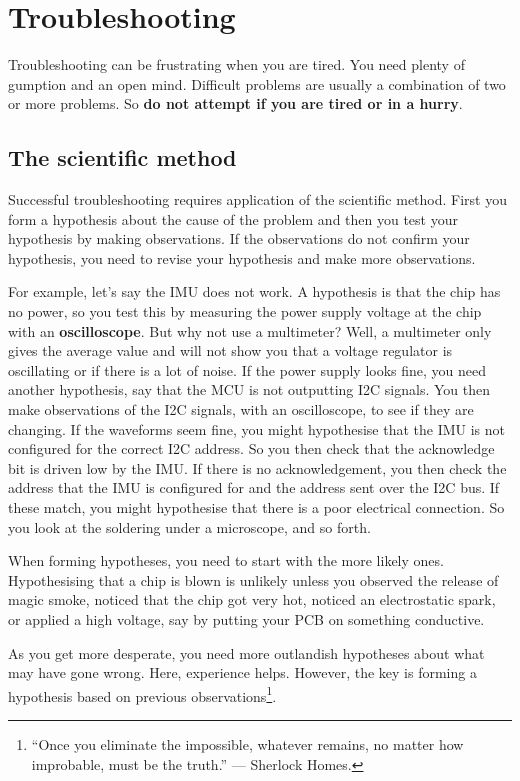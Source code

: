 \chapter{Troubleshooting}
\label{troubleshooting}

Troubleshooting can be frustrating when you are tired. You need plenty
of gumption and an open mind. Difficult problems are usually a
combination of two or more problems. So \textbf{do not attempt if you
  are tired or in a hurry}.

\section{The scientific method}

Successful troubleshooting requires application of the scientific
method.  First you form a hypothesis about the cause of the problem
and then you test your hypothesis by making observations.  If the
observations do not confirm your hypothesis, you need to revise your
hypothesis and make more observations.

For example, let's say the IMU does not work.  A hypothesis is that
the chip has no power, so you test this by measuring the power supply
voltage at the chip with an \textbf{oscilloscope}.  But why not use a
multimeter?  Well, a multimeter only gives the average value and will
not show you that a voltage regulator is oscillating or if there is a
lot of noise.  If the power supply looks fine, you need another
hypothesis, say that the MCU is not outputting I2C signals.  You then
make observations of the I2C signals, with an oscilloscope, to see if
they are changing.  If the waveforms seem fine, you might hypothesise
that the IMU is not configured for the correct I2C address.  So you
then check that the acknowledge bit is driven low by the IMU.  If
there is no acknowledgement, you then check the address that the IMU
is configured for and the address sent over the I2C bus.  If these
match, you might hypothesise that there is a poor electrical
connection.  So you look at the soldering under a microscope, and so
forth.

When forming hypotheses, you need to start with the more likely ones.
Hypothesising that a chip is blown is unlikely unless you observed the
release of magic smoke, noticed that the chip got very hot, noticed an
electrostatic spark, or applied a high voltage, say by putting your
PCB on something conductive.

As you get more desperate, you need more outlandish hypotheses about
what may have gone wrong.  Here, experience helps.  However, the key
is forming a hypothesis based on previous observations\footnote{``Once
  you eliminate the impossible, whatever remains, no matter how
  improbable, must be the truth.'' --- Sherlock Homes.}.


